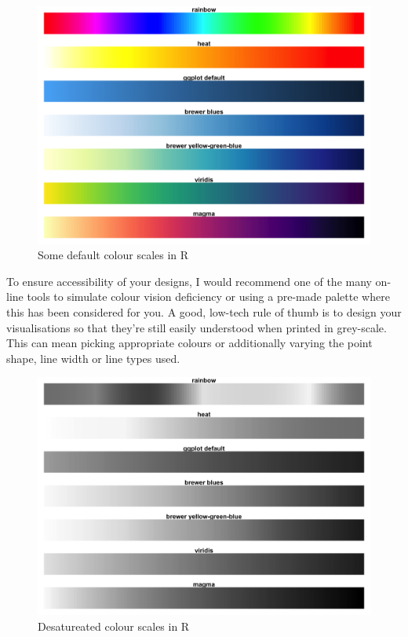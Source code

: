 \documentclass[
  12pt,
]{book}
\begin{document}
\begin{figure}
\includegraphics[width=1\linewidth]{images/303-data-visualisation/saturated-colour-scales} \caption{Some default colour scales in R}\label{fig:unnamed-chunk-5}
\end{figure}

To ensure accessibility of your designs, I would recommend one of the many on-line tools to simulate colour vision deficiency or using a pre-made palette where this has been considered for you. A good, low-tech rule of thumb is to design your visualisations so that they're still easily understood when printed in grey-scale. This can mean picking appropriate colours or additionally varying the point shape, line width or line types used.

\begin{figure}
\includegraphics[width=1\linewidth]{images/303-data-visualisation/desaturated-colour-scales} \caption{Desatureated colour scales in R}\label{fig:unnamed-chunk-6}
\end{figure}
\end{document}
